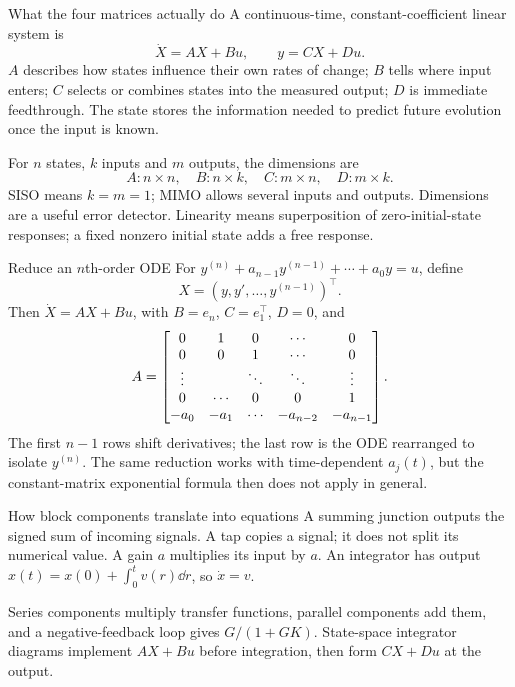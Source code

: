 \begin{concept}{What the four matrices actually do}
A continuous-time, constant-coefficient linear system is
\[\dot X=AX+Bu,\qquad y=CX+Du.\]
$A$ describes how states influence their own rates of change; $B$ tells where input enters; $C$ selects or combines states into the measured output; $D$ is immediate feedthrough. The state stores the information needed to predict future evolution once the input is known.

For $n$ states, $k$ inputs and $m$ outputs, the dimensions are
\[A:n\times n,\quad B:n\times k,\quad C:m\times n,\quad D:m\times k.\]
SISO means $k=m=1$; MIMO allows several inputs and outputs. Dimensions are a useful error detector. Linearity means superposition of zero-initial-state responses; a fixed nonzero initial state adds a free response.
\end{concept}
\begin{method}{Reduce an $n$th-order ODE}
For $y^{(n)}+a_{n-1}y^{(n-1)}+\cdots+a_0y=u$, define
\[X=(y,y',\ldots,y^{(n-1)})^{\top}.\]
Then $\dot X=AX+Bu$, with $B=e_n$, $C=e_1^{\top}$, $D=0$, and
\[A=\begin{bmatrix}0&1&0&\cdots&0\\0&0&1&\cdots&0\\\vdots&&\ddots&\ddots&\vdots\\0&\cdots&0&0&1\\-a_0&-a_1&\cdots&-a_{n-2}&-a_{n-1}\end{bmatrix}.\]
The first $n-1$ rows shift derivatives; the last row is the ODE rearranged to isolate $y^{(n)}$. The same reduction works with time-dependent $a_j(t)$, but the constant-matrix exponential formula then does not apply in general.
\end{method}
\begin{concept}{How block components translate into equations}
A summing junction outputs the signed sum of incoming signals. A tap copies a signal; it does not split its numerical value. A gain $a$ multiplies its input by $a$. An integrator has output $x(t)=x(0)+\int_0^t v(r)\dd r$, so $\dot x=v$.

Series components multiply transfer functions, parallel components add them, and a negative-feedback loop gives $G/(1+GK)$. State-space integrator diagrams implement $AX+Bu$ before integration, then form $CX+Du$ at the output.
\end{concept}
